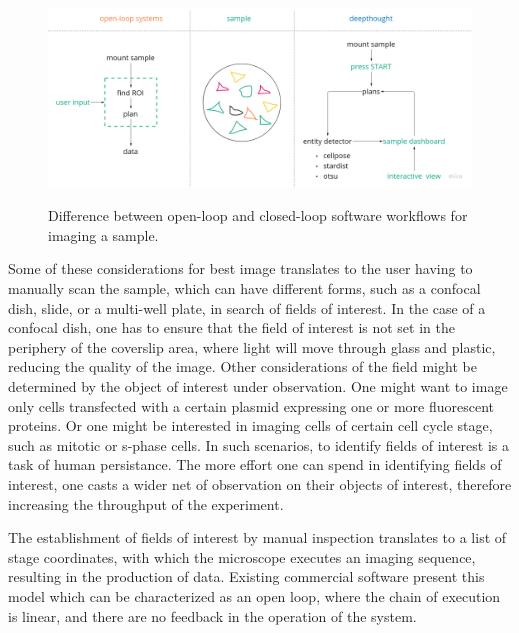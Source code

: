 \begin{figure}[H]
    {\hfill\includegraphics[clip, width=1\linewidth]{figures/control_loop.jpg}\hspace*{\fill}}
    \caption{Difference between open-loop and closed-loop software workflows for imaging a sample.}
    {\label{fig:control_loop}}
\end{figure}


Some of these considerations for best image translates to the user having to manually scan the sample, which can have different forms, such as a confocal dish, slide, or a multi-well plate, in search of fields of interest. In the case of a confocal dish, one has to ensure that the field of interest is not set in the periphery of the coverslip area, where light will move through glass and plastic, reducing the quality of the image. Other considerations of the field might be determined by the object of interest under observation. One might want to image only cells transfected with a certain plasmid expressing one or more fluorescent proteins. Or one might be interested in imaging cells of certain cell cycle stage, such as mitotic or s-phase cells. In such scenarios, to identify fields of interest is a task of human persistance. The more effort one can spend in identifying fields of interest, one casts a wider net of observation on their objects of interest, therefore increasing the throughput of the experiment.

The establishment of fields of interest by manual inspection translates to a list of stage coordinates, with which the microscope executes an imaging sequence, resulting in the production of data. Existing commercial software present this model which can be characterized as an open loop, where the chain of execution is linear, and there are no feedback in the operation of the system.

